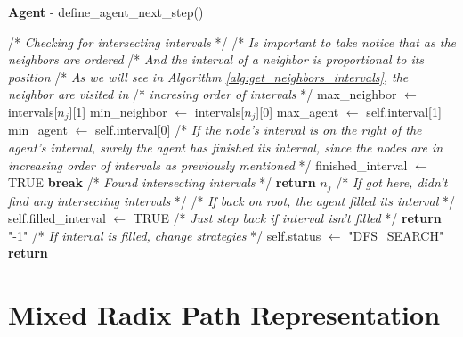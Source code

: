 \begin{algorithm}
\ContinuedFloat
\caption{\textbf{Agent} - define\_agent\_next\_step()}
\begin{algorithmic}
        \State
        \State /* \textit{Checking for intersecting intervals} */
        \State /* \textit{Is important to take notice that as the neighbors are ordered}
        \State /* \textit{And the interval of a neighbor is proportional to its position}
        \State /* \textit{As we will see in Algorithm \ref{alg:get_neighbors_intervals}, the neighbor are visited in}
        \State /* \textit{incresing order of intervals} */
            \State max\_neighbor $\gets$ intervals[$n_{j}$][1]
            \State min\_neighbor $\gets$ intervals[$n_{j}$][0]
            \State max\_agent $\gets$ self.interval[1]
            \State min\_agent $\gets$ self.interval[0]
            \State
                \State 
                \State /* \textit{If the node's interval is on the right of the agent's interval, surely the}
                \State \textit{agent has finished its interval, since the nodes are in increasing order of}
                \State \textit{intervals as previously mentioned} */
                \State finished\_interval $\gets$ TRUE
                \State \textbf{break}
                \State /* \textit{Found intersecting intervals} */
                \State \textbf{return} $n_{j}$
            \EndIf
        \EndFor
        \State
        \State /* \textit{If got here, didn't find any intersecting intervals } */
        \State /* \textit{If back on root, the agent filled its interval } */
            \State self.filled\_interval $\gets$ TRUE
        \EndIf
        \State
        \State /* \textit{Just step back if interval isn't filled} */
            \State \textbf{return} "-1"
        \EndIf
        \State
        \State /* \textit{If interval is filled, change strategies} */
        \State self.status $\gets$ "DFS\_SEARCH"
        \State \textbf{return}
    \EndProcedure
\end{algorithmic}
\end{algorithm}

\section{Mixed Radix Path Representation}
\label{section_method_mixed_radix}

